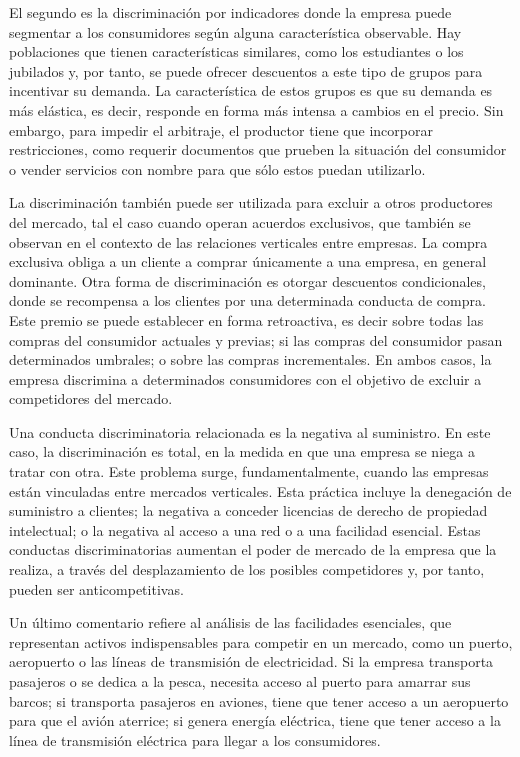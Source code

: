 \documentclass[
  12pt,
  spanish,
]{book}
\begin{document}
El segundo es la discriminación por indicadores donde la empresa puede segmentar a los consumidores según alguna característica observable. Hay poblaciones que tienen características similares, como los estudiantes o los jubilados y, por tanto, se puede ofrecer descuentos a este tipo de grupos para incentivar su demanda. La característica de estos grupos es que su demanda es más elástica, es decir, responde en forma más intensa a cambios en el precio. Sin embargo, para impedir el arbitraje, el productor tiene que incorporar restricciones, como requerir documentos que prueben la situación del consumidor o vender servicios con nombre para que sólo estos puedan utilizarlo.

La discriminación también puede ser utilizada para excluir a otros productores del mercado, tal el caso cuando operan acuerdos exclusivos, que también se observan en el contexto de las relaciones verticales entre empresas. La compra exclusiva obliga a un cliente a comprar únicamente a una empresa, en general dominante. Otra forma de discriminación es otorgar descuentos condicionales, donde se recompensa a los clientes por una determinada conducta de compra. Este premio se puede establecer en forma retroactiva, es decir sobre todas las compras del consumidor actuales y previas; si las compras del consumidor pasan determinados umbrales; o sobre las compras incrementales. En ambos casos, la empresa discrimina a determinados consumidores con el objetivo de excluir a competidores del mercado.

Una conducta discriminatoria relacionada es la negativa al suministro. En este caso, la discriminación es total, en la medida en que una empresa se niega a tratar con otra. Este problema surge, fundamentalmente, cuando las empresas están vinculadas entre mercados verticales. Esta práctica incluye la denegación de suministro a clientes; la negativa a conceder licencias de derecho de propiedad intelectual; o la negativa al acceso a una red o a una facilidad esencial. Estas conductas discriminatorias aumentan el poder de mercado de la empresa que la realiza, a través del desplazamiento de los posibles competidores y, por tanto, pueden ser anticompetitivas.

Un último comentario refiere al análisis de las facilidades esenciales, que representan activos indispensables para competir en un mercado, como un puerto, aeropuerto o las líneas de transmisión de electricidad. Si la empresa transporta pasajeros o se dedica a la pesca, necesita acceso al puerto para amarrar sus barcos; si transporta pasajeros en aviones, tiene que tener acceso a un aeropuerto para que el avión aterrice; si genera energía eléctrica, tiene que tener acceso a la línea de transmisión eléctrica para llegar a los consumidores.
\end{document}
